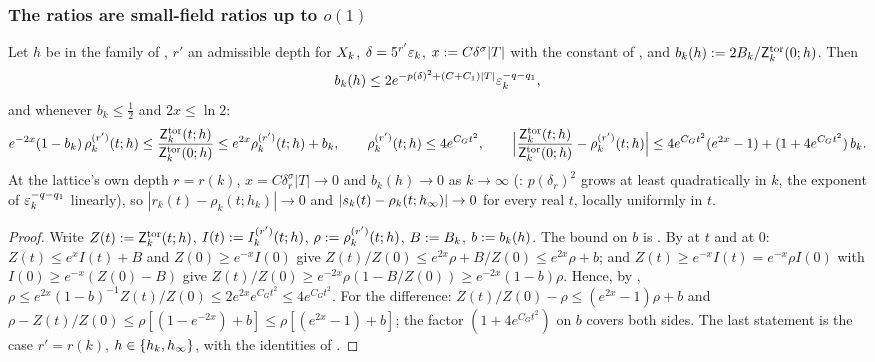 \subsubsection*{The ratios are small-field ratios up to $o(1)$}

\begin{lemma}\label{rot:lem:H6stepA}
Let $h$ be in the family of , $r'$ an admissible depth for $X_k$, $\delta=5^{r'}\varepsilon_k$, $x:= C\delta^\sigma|T|$ with the constant of , and $b_k(h):=2B_k/\mathsf Z^{\rm tor}_k(0;h)$. Then
\[
b_k(h)\le2e^{-p(\delta)^2+(C+C_1)|T|}\varepsilon_k^{-q-q_1},
\]
and whenever $b_k\le\frac12$ and $2x\le\ln2$:
\begin{equation}\label{rot:eq:H6stepA}
e^{-2x}(1-b_k)\,\rho^{(r')}_k(t;h)\le\frac{\mathsf Z^{\rm tor}_k(t;h)}{\mathsf Z^{\rm tor}_k(0;h)}\le e^{2x}\rho^{(r')}_k(t;h)+b_k,\qquad
\rho^{(r')}_k(t;h)\le4e^{C_Gt^2},\qquad
\Big|\frac{\mathsf Z^{\rm tor}_k(t;h)}{\mathsf Z^{\rm tor}_k(0;h)}-\rho^{(r')}_k(t;h)\Big|\le4e^{C_Gt^2}(e^{2x}-1)+(1+4e^{C_Gt^2})\,b_k .
\end{equation}
At the lattice's own depth $r=r(k)$, $x=C\delta_r^\sigma|T|\to0$ and $b_k(h)\to0$ as $k\to\infty$ (: $p(\delta_r)^2$ grows at least quadratically in $k$, the exponent of $\varepsilon_k^{-q-q_1}$ linearly), so $|r_k(t)-\rho_k(t;h_k)|\to0$ and $|s_k(t)-\rho_k(t;h_\infty)|\to0$ for every real $t$, locally uniformly in $t$.
\end{lemma}
\begin{proof}
Write $Z(t):=\mathsf Z^{\rm tor}_k(t;h)$, $I(t):= I^{(r')}_k(t;h)$, $\rho:=\rho^{(r')}_k(t;h)$, $B:= B_k$, $b:= b_k(h)$. The bound on $b$ is . By  at $t$ and at $0$: $Z(t)\le e^xI(t)+B$ and $Z(0)\ge e^{-x}I(0)$ give $Z(t)/Z(0)\le e^{2x}\rho+B/Z(0)\le e^{2x}\rho+b$; and $Z(t)\ge e^{-x}I(t)=e^{-x}\rho I(0)$ with $I(0)\ge e^{-x}(Z(0)-B)$ give $Z(t)/Z(0)\ge e^{-2x}\rho(1-B/Z(0))\ge e^{-2x}(1-b)\rho$. Hence, by , $\rho\le e^{2x}(1-b)^{-1}Z(t)/Z(0)\le2e^{2x}e^{C_Gt^2}\le4e^{C_Gt^2}$. For the difference: $Z(t)/Z(0)-\rho\le(e^{2x}-1)\rho+b$ and $\rho-Z(t)/Z(0)\le\rho[(1-e^{-2x})+b]\le\rho[(e^{2x}-1)+b]$; the factor $(1+4e^{C_Gt^2})$ on $b$ covers both sides. The last statement is the case $r'=r(k)$, $h\in\{h_k,h_\infty\}$, with the identities of .
\end{proof}
